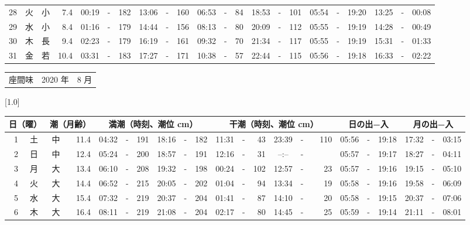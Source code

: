 \documentclass[12pt,a4j]{jsarticle}
\begin{document}
\begin{table}[htbp]
\begin{center}
{\begin{tabular}{|rc|cr|ccrccr|ccrccr|ccc|ccc|}
28 & 火 & 小 &  7.4 &  00:19 &-& 182 &  13:06 &-& 160 &  06:53 &-&  84 &  18:53 &-& 101 & 05:54 & -& 19:20 & 13:25 & -& 00:08 \\
29 & 水 & 小 &  8.4 &  01:16 &-& 179 &  14:44 &-& 156 &  08:13 &-&  80 &  20:09 &-& 112 & 05:55 & -& 19:19 & 14:28 & -& 00:49 \\
30 & 木 & 長 &  9.4 &  02:23 &-& 179 &  16:19 &-& 161 &  09:32 &-&  70 &  21:34 &-& 117 & 05:55 & -& 19:19 & 15:31 & -& 01:33 \\
31 & 金 & 若 & 10.4 &  03:31 &-& 183 &  17:27 &-& 171 &  10:38 &-&  57 &  22:44 &-& 115 & 05:56 & -& 19:18 & 16:33 & -& 02:22 \\
   \hline
   \end{tabular}}
   \end{center}
\end{table}
\newpage
 \begin{table}[htbp]
 \begin{center}
 \begin{tabular}{lcc}
 \LARGE{座間味}  & \large{2020 年} & \large{ 8 月} \\
 \end{tabular}
 \end{center}
 \begin{center}
    \scalebox{0.7}[1.0]{
    \begin{tabular}{|rc|cr|ccrccr|ccrccr|ccc|ccc|}
    \hline
    \multicolumn{2}{|c|}{日（曜）} & \multicolumn{2}{c|}{潮（月齢）} & \multicolumn{6}{c|}{満潮（時刻、潮位 cm）} & \multicolumn{6}{c|}{干潮（時刻、潮位 cm）} & \multicolumn{3}{c|}{日の出−入} &  \multicolumn{3}{c|}{月の出−入}\\
 \hline
 1 & 土 & 中 & 11.4 &  04:32 &-& 191 &  18:16 &-& 182 &  11:31 &-&  43 &  23:39 &-& 110 & 05:56 & -& 19:18 & 17:32 & -& 03:15 \\
 2 & 日 & 中 & 12.4 &  05:24 &-& 200 &  18:57 &-& 191 &  12:16 &-&  31 &  --:-- &-&~~~~~ & 05:57 & -& 19:17 & 18:27 & -& 04:11 \\
 3 & 月 & 大 & 13.4 &  06:10 &-& 208 &  19:32 &-& 198 &  00:24 &-& 102 &  12:57 &-&  23 & 05:57 & -& 19:16 & 19:15 & -& 05:10 \\
 4 & 火 & 大 & 14.4 &  06:52 &-& 215 &  20:05 &-& 202 &  01:04 &-&  94 &  13:34 &-&  19 & 05:58 & -& 19:16 & 19:58 & -& 06:09 \\
 5 & 水 & 大 & 15.4 &  07:32 &-& 219 &  20:37 &-& 204 &  01:41 &-&  87 &  14:10 &-&  20 & 05:58 & -& 19:15 & 20:37 & -& 07:06 \\
 6 & 木 & 大 & 16.4 &  08:11 &-& 219 &  21:08 &-& 204 &  02:17 &-&  80 &  14:45 &-&  25 & 05:59 & -& 19:14 & 21:11 & -& 08:01 \\

\end{tabular}}
\end{center}
\end{table}
\end{document}
